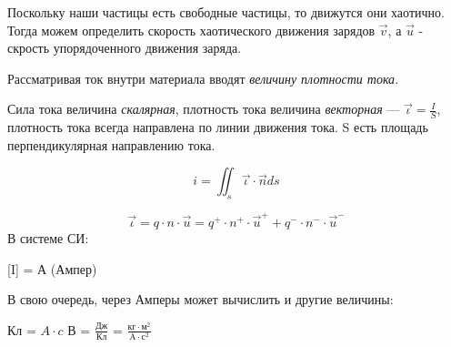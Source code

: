 \documentclass[../main.tex]{subfiles}
\begin{document}
Поскольку наши частицы есть свободные частицы, то движутся они хаотично. Тогда можем определить скорость хаотического движения зарядов $\vec v$,
а $\vec u$ - скрость упорядоченного движения заряда. 

Рассматривая ток внутри материала вводят \textit{величину плотности тока.}

Сила тока величина \textit{скалярная}, плотность тока величина \textit{векторная} --- $\vec \iota = \frac{I}{S}$,
плотность тока всегда направлена по линии движения тока. S есть площадь перпендикулярная направлению тока.

\[i = \iint_{s} \vec \iota \cdot \vec n ds\]

\[\vec \iota = q \cdot n \cdot \vec u = q^{+} \cdot n^{+} \cdot \vec u^{+} + q^{-} \cdot n^{-} \cdot \vec u^{-}\]
В системе СИ:

[I] = А (Ампер)

В свою очередь, через Амперы может вычислить и другие величины:
\begin{center}
    Кл = $A \cdot c$
    В = $\frac{\text{Дж}}{\text{Кл}}$ = $\frac{\text{кг} \cdot \text{м}^2}{\text{A} \cdot \text{с}^2}$
\end{center}
\end{document}
